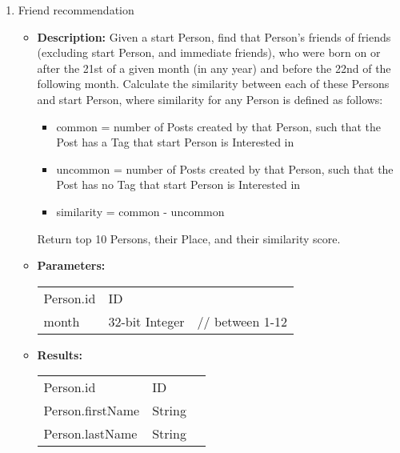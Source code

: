 {\begin{enumerate}
    \item Friend recommendation
        \begin{itemize}
            \item \textbf{Description:}
                Given a start Person, find that Person's friends of friends
                (excluding start Person, and immediate friends), who were born on
                or after the 21st of a given month (in any year) and before the
                22nd of the following month.  Calculate the similarity between each
                of these Persons and start Person, where similarity for any Person
                is defined as follows: 
                \begin{itemize}
                    \item common = number of Posts created by that Person, such that the Post has a Tag that start Person is Interested in
                    \item uncommon = number of Posts created by that Person, such that the Post has no Tag that start Person is Interested in
                    \item similarity = common - uncommon
                \end{itemize}
                Return top 10 Persons, their Place, and their similarity score.
            \item \textbf{Parameters:} \\
                \begin{tabular}{lll}
                    Person.id 	 						& ID & \parbox[t]{20cm}{\par \strut} \\
                    month 		 						& 32-bit Integer & \parbox[t]{20cm}{// between 1-12\par \strut} \\
                \end{tabular}		
            \item \textbf{Results:} \\
                \begin{tabular}{lll}
                    Person.id 	 						& ID & \parbox[t]{20cm}{\par \strut} \\
                    Person.firstName 	 				& String & \parbox[t]{20cm}{\par \strut} \\
                    Person.lastName 	 				& String & \parbox[t]{20cm}{\par \strut} \\

\end{tabular}
\end{itemize}
\end{enumerate}}
